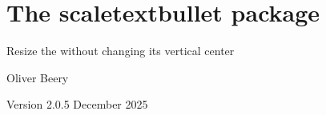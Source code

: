 \documentclass{article}
\begin{document}
\section*{\LARGE The \textsf{scaletextbullet} package}

Resize the \texttt{\string\textbullet} without changing its vertical center

Oliver Beery

Version 2.0.5 December 2025

\end{document}
